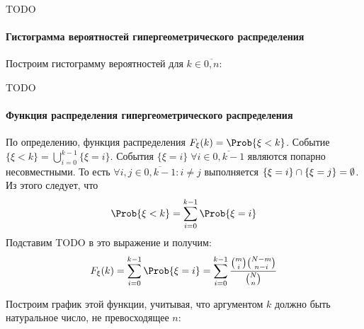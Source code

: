 TODO

\hypertarget{ux433ux438ux441ux442ux43eux433ux440ux430ux43cux43cux430-ux432ux435ux440ux43eux44fux442ux43dux43eux441ux442ux435ux439-ux433ux438ux43fux435ux440ux433ux435ux43eux43cux435ux442ux440ux438ux447ux435ux441ux43aux43eux433ux43e-ux440ux430ux441ux43fux440ux435ux434ux435ux43bux435ux43dux438ux44f}{%
\paragraph{Гистограмма вероятностей гипергеометрического
распределения}\label{ux433ux438ux441ux442ux43eux433ux440ux430ux43cux43cux430-ux432ux435ux440ux43eux44fux442ux43dux43eux441ux442ux435ux439-ux433ux438ux43fux435ux440ux433ux435ux43eux43cux435ux442ux440ux438ux447ux435ux441ux43aux43eux433ux43e-ux440ux430ux441ux43fux440ux435ux434ux435ux43bux435ux43dux438ux44f}}

Построим гистограмму вероятностей для \(k \in \overline{0, n}\):

TODO

\hypertarget{ux444ux443ux43dux43aux446ux438ux44f-ux440ux430ux441ux43fux440ux435ux434ux435ux43bux435ux43dux438ux44f-ux433ux438ux43fux435ux440ux433ux435ux43eux43cux435ux442ux440ux438ux447ux435ux441ux43aux43eux433ux43e-ux440ux430ux441ux43fux440ux435ux434ux435ux43bux435ux43dux438ux44f}{%
\paragraph{Функция распределения гипергеометрического
распределения}\label{ux444ux443ux43dux43aux446ux438ux44f-ux440ux430ux441ux43fux440ux435ux434ux435ux43bux435ux43dux438ux44f-ux433ux438ux43fux435ux440ux433ux435ux43eux43cux435ux442ux440ux438ux447ux435ux441ux43aux43eux433ux43e-ux440ux430ux441ux43fux440ux435ux434ux435ux43bux435ux43dux438ux44f}}

По определению, функция распределения \(F_\xi(k) = \Prob{\xi < k}\).
Событие \(\{\xi < k\} = \bigcup\limits_{i=0}^{k-1}\{\xi=i\}\). События
\(\{\xi=i\}\; \forall i \in \overline{0, k-1}\) являются попарно
несовместными. То есть \(\forall i,j \in \overline{0, k-1}: i \neq j\)
выполняется \(\{\xi=i\}\large\cap\{\xi=j\}=\emptyset\). Из этого
следует, что \[\Prob{\xi < k} = \sum_{i=0}^{k-1}\Prob{\xi = i}\]
Подставим TODO в это выражение и получим: \[F_\xi(k)
= \sum_{i=0}^{k-1}\Prob{\xi = i}
= \sum_{i=0}^{k-1}\frac{\binom{m}{i}\binom{N-m}{n-i}}{\binom{N}{n}}\]

Построим график этой функции, учитывая, что аргументом \(k\) должно быть
натуральное число, не превосходящее \(n\):

